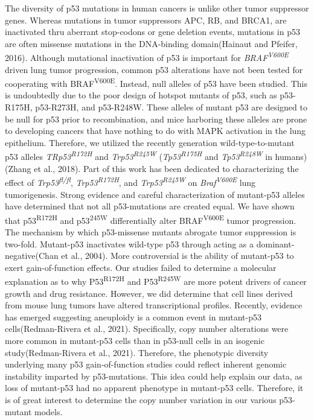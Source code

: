 The diversity of p53 mutations in human cancers is unlike other tumor suppressor genes. Whereas mutations in tumor suppressors APC, RB, and BRCA1, are inactivated thru aberrant stop-codons or gene deletion events, mutations in p53 are often missense mutations in the DNA-binding domain(Hainaut and Pfeifer, 2016). Although mutational inactivation of p53 is important for \emph{BRAF\textsuperscript{V600E}} driven lung tumor progression, common p53 alterations have not been tested for cooperating with BRAF\textsuperscript{V600E}. Instead, null alleles of p53 have been studied. This is undoubtedly due to the poor design of hotspot mutants of p53, such as p53-R175H, p53-R273H, and p53-R248W. These alleles of mutant p53 are designed to be null for p53 prior to recombination, and mice harboring these alleles are prone to developing cancers that have nothing to do with MAPK activation in the lung epithelium. Therefore, we utilized the recently generation wild-type-to-mutant p53 alleles \emph{TRp53\textsuperscript{R172H}} and \emph{Trp53\textsuperscript{R245W}} (\emph{Tp53\textsuperscript{R175H}} and \emph{Tp53\textsuperscript{R248W}} in humans)(Zhang et al., 2018). Part of this work has been dedicated to characterizing the effect of \emph{Trp53\textsuperscript{fl/fl}}, \emph{Trp53\textsuperscript{R172H}}, and \emph{Trp53\textsuperscript{R245W}} on \emph{Braf\textsuperscript{V600E}} lung tumorigenesis. Strong evidence and careful characterization of mutant-p53 alleles have determined that not all p53-mutations are created equal. We have shown that p53\textsuperscript{R172H} and p53\textsuperscript{245W} differentially alter BRAF\textsuperscript{V600E} tumor progression. The mechanism by which p53-missense mutants abrogate tumor suppression is two-fold. Mutant-p53 inactivates wild-type p53 through acting as a dominant-negative(Chan et al., 2004). More controversial is the ability of mutant-p53 to exert gain-of-function effects. Our studies failed to determine a molecular explanation as to why P53\textsuperscript{R172H} and P53\textsuperscript{R245W} are more potent drivers of cancer growth and drug resistance. However, we did determine that cell lines derived from mouse lung tumors have altered transcriptional profiles. Recently, evidence has emerged suggesting aneuploidy is a common event in mutant-p53 cells(Redman-Rivera et al., 2021). Specifically, copy number alterations were more common in mutant-p53 cells than in p53-null cells in an isogenic study(Redman-Rivera et al., 2021). Therefore, the phenotypic diversity underlying many p53 gain-of-function studies could reflect inherent genomic instability imparted by p53-mutations. This idea could help explain our data, as loss of mutant-p53 had no apparent phenotype in mutant-p53 cells. Therefore, it is of great interest to determine the copy number variation in our various p53-mutant models.

